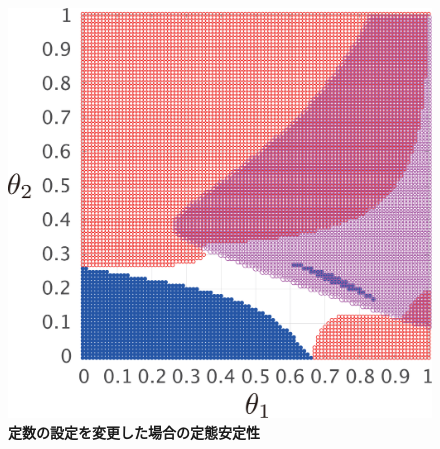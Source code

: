 \documentclass[tombow,dvipdfmx]{corona-a5-1.1}
\begin{document}
\begin{figure}[t]
{\begin{minipage}{0.49\linewidth}
    \medskip
  \end{minipage}
    \centering
    \includegraphics[width = .4\linewidth]{figs/gam5ex}
  }
  \medskip
  \caption{\textbf{定数の設定を変更した場合の定態安定性}}
  \label{fig:gamex}
\medskip
\end{figure}
\end{document}
